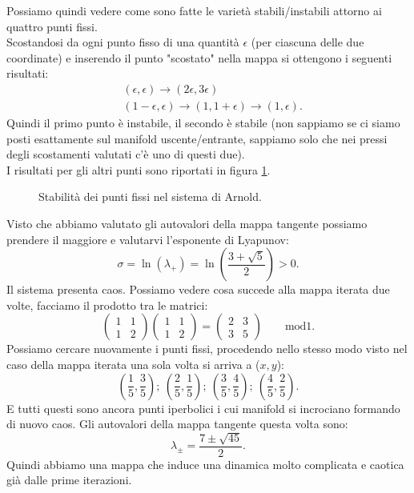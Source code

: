 \begin{exmp}
    Possiamo quindi vedere come sono fatte le varietà stabili/instabili attorno ai quattro punti fissi. \\
    Scostandosi da ogni punto fisso di una quantità $\epsilon$ (per ciascuna delle due coordinate) e inserendo il punto "scostato" nella mappa si ottengono i seguenti risultati:
    \[\begin{aligned}
	&(\epsilon,\epsilon)\to (2\epsilon, 3\epsilon)\\
	& (1-\epsilon, \epsilon) \to (1, 1+\epsilon) \to (1, \epsilon)
    .\end{aligned}\]
    Quindi il primo punto è instabile, il secondo è stabile (non sappiamo se ci siamo posti esattamente sul manifold uscente/entrante, sappiamo solo che nei pressi degli scostamenti valutati c'è uno di questi due).\\
    I risultati per gli altri punti sono riportati in figura \ref{fig:21_stab_instab}.
    \begin{figure}[H]
        \centering
	\caption{\scriptsize Stabilità dei punti fissi nel sistema di Arnold.}
        \label{fig:21_stab_instab}
    \end{figure}
    \noindent 
    Visto che abbiamo valutato gli autovalori della mappa tangente possiamo prendere il maggiore e valutarvi l'esponente di Lyapunov:
    \[
	\sigma  = \ln (\lambda_+) = \ln\left(\frac{3 + \sqrt{5} }{2}\right) > 0 
    .\] 
    Il sistema presenta caos.
    Possiamo vedere cosa succede alla mappa iterata due volte, facciamo il prodotto tra le matrici:
    \[
        \begin{pmatrix} 
	    1 & 1 \\
	    1 & 2
	\end{pmatrix} 
        \begin{pmatrix} 
	    1 & 1 \\
	    1 & 2
	\end{pmatrix} 
	= 
	\begin{pmatrix} 
	    2 & 3\\
	    3 & 5
	\end{pmatrix} 
	\qquad \text{mod}1
    .\] 
    Possiamo cercare nuovamente i punti fissi, procedendo nello stesso modo visto nel caso della mappa iterata una sola volta si arriva a ($x, y$):
    \[
        \left(\frac{1}{5}, \frac{3}{5}\right); \ \left(\frac{2}{5}, \frac{1}{5}\right); \ 
	\left(\frac{3}{5}, \frac{4}{5}\right); \ \left(\frac{4}{5}, \frac{2}{5}\right)
    .\] 
    E tutti questi sono ancora punti iperbolici i cui manifold si incrociano formando di nuovo caos. Gli autovalori della mappa tangente questa volta sono:
    \[
        \lambda_{\pm} = \frac{7 \pm \sqrt{45}}{2}
    .\] 
    Quindi abbiamo una mappa che induce una dinamica molto complicata e caotica già dalle prime iterazioni.
\end{exmp}
